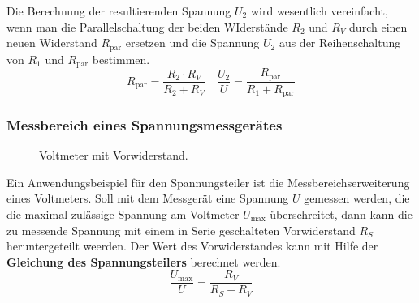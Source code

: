\noindent Die Berechnung der resultierenden Spannung $U_2$ wird wesentlich vereinfacht, wenn man die Parallelschaltung der beiden WIderstände $R_2$ und $R_V$ durch einen neuen Widerstand $R_{\text{par}}$ ersetzen und die Spannung $U_2$ aus der Reihenschaltung von $R_1$ und $R_{\text{par}}$ bestimmen.
\begin{equation}
\boxed{R_{\text{par}}=\dfrac{R_2\cdot R_V}{R_2+R_V}}\quad \boxed{\dfrac{U_2}{U}=\dfrac{R_{\text{par}}}{R_1+R_{\text{par}}}}
\end{equation}
\subsubsection{Messbereich eines Spannungsmessgerätes}
\begin{figure}[H]
\centering
\caption{Voltmeter mit Vorwiderstand.}
\label{fig_IIIs}
\end{figure}
\noindent Ein Anwendungsbeispiel für den Spannungsteiler ist die Messbereichserweiterung eines Voltmeters. Soll mit dem Messgerät eine Spannung $U$ gemessen werden, die die maximal zulässige Spannung am Voltmeter $U_{\text{max}}$ überschreitet, dann kann die zu messende Spannung mit einem in Serie geschalteten Vorwiderstand $R_S$ heruntergeteilt weerden. Der Wert des Vorwiderstandes kann mit Hilfe der \textbf{Gleichung des Spannungsteilers} berechnet werden.
\begin{equation}
\boxed{\dfrac{U_{\text{max}}}{U}=\dfrac{R_V}{R_S+R_V}}
\end{equation}
